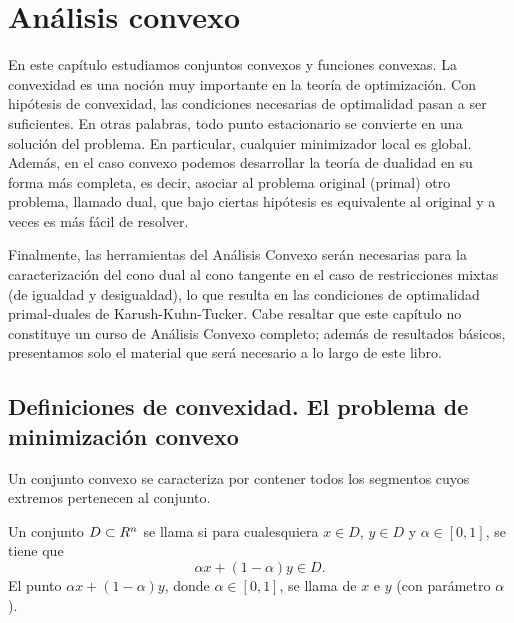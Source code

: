 
\chapter{Análisis convexo}
\label{v1:chap:3}

En este capítulo estudiamos conjuntos convexos y funciones convexas. La convexidad es una noción muy importante en la teoría de optimización. Con hipótesis de convexidad, las condiciones necesarias de optimalidad pasan a ser suficientes. En otras palabras, todo punto estacionario se convierte en una solución del problema. En particular, cualquier minimizador local es global. Además, en el caso convexo podemos desarrollar la teoría de dualidad en su forma más completa, es decir, asociar al problema original (primal) otro problema, llamado dual, que bajo ciertas hipótesis es equivalente al original y a veces es más fácil de resolver. 

Finalmente, las herramientas del Análisis Convexo serán necesarias para la caracterización del cono dual al cono tangente en el caso de restricciones mixtas (de igualdad y desigualdad), lo que resulta en las condiciones de optimalidad primal-duales de Karush-Kuhn-Tucker. Cabe resaltar que este capítulo no constituye un curso de Análisis Convexo completo; además de resultados básicos, presentamos solo el material que será necesario a lo largo de este libro.

\section{Definiciones de convexidad. El problema de minimización convexo}
\label{v1:sec:3.1}

Un conjunto convexo se caracteriza por contener todos los segmentos cuyos extremos pertenecen al conjunto.

\begin{definition}\label{v1:def:3.1.1}
 Un conjunto $D \subset R^n$ se llama  si para cualesquiera $x \in D$, $y \in D$ y $\alpha \in [0, 1]$, se tiene que
 \[
 \alpha x + (1 - \alpha)y \in D.
 \]
 El punto $\alpha x + (1 - \alpha)y$, donde $\alpha \in [0, 1]$, se llama  de $x$ e $y$ (con parámetro $\alpha$).
\end{definition}

